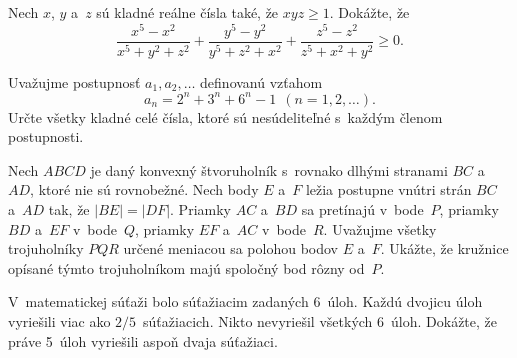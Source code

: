{%
Nech $x$, $y$ a~$z$ sú kladné reálne čísla také, že $xyz \geq 1$. Dokážte, že
$$
\frac{x^5 - x^2}
{x^5 + y^2 + z^2}
+
\frac{y^5 - y^2}
{y^5 + z^2 + x^2}
+
\frac{z^5 - z^2}
{z^5 + x^2 + y^2}
\geq 0.
$$}

{%
Uvažujme postupnosť $a_1, a_2, \ldots$ definovanú vzťahom
$$a_n = 2^n + 3^n + 6^n -1\ \ (n=1,2,\ldots).$$
Určte všetky kladné celé čísla, ktoré sú nesúdeliteľné s~každým členom postupnosti.}

{%
Nech $ABCD$ je daný konvexný štvoruholník s~rovnako dlhými stranami $BC$ a~$AD$, ktoré nie sú rovnobežné. Nech body $E$ a~$F$ ležia postupne vnútri strán $BC$ a~$AD$ tak, že $|BE|=|DF|$. Priamky $AC$ a~$BD$ sa pretínajú v~bode~$P$, priamky $BD$ a~$EF$ v~bode~$Q$, priamky $EF$ a~$AC$ v~bode~$R$. Uvažujme všetky trojuholníky $PQR$ určené meniacou sa polohou bodov $E$ a~$F$. Ukážte, že kružnice opísané týmto trojuholníkom majú spoločný bod rôzny od~$P$.}

{%
V~matematickej súťaži bolo súťažiacim zadaných 6~úloh. Každú dvojicu úloh vyriešili viac ako $2/5$~súťažiacich. Nikto nevyriešil všetkých 6~úloh. Dokážte, že práve 5~úloh vyriešili aspoň dvaja súťažiaci.}

